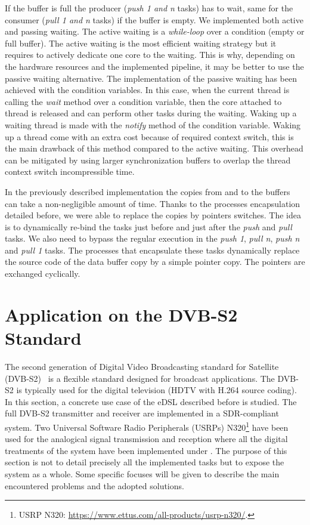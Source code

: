If the buffer is full the producer (\emph{push 1 and n} tasks) has to wait, same
for the consumer (\emph{pull 1 and n} tasks) if the buffer is empty. We
implemented both active and passing waiting. The active waiting is a
\emph{while-loop} over a condition (empty or full buffer). The active waiting is
the most efficient waiting strategy but it requires to actively dedicate one
core to the waiting. This is why, depending on the hardware resources and the
implemented pipeline, it may be better to use the passive waiting alternative.
The implementation of the passive waiting has been achieved with the 
condition variables. In this case, when the current thread is calling the
\emph{wait} method over a condition variable, then the core attached to thread
is released and can perform other tasks during the waiting. Waking up a waiting
thread is made with the \emph{notify} method of the condition variable. Waking
up a thread come with an extra cost because of required context switch, this is
the main drawback of this method compared to the active waiting. This overhead
can be mitigated by using larger synchronization buffers to overlap the thread
context switch incompressible time.

In the previously described implementation the copies from and to the buffers
can take a non-negligible amount of time. Thanks to the processes encapsulation
detailed before, we were able to replace the copies by pointers switches. The
idea is to dynamically re-bind the tasks just before and just after the
\emph{push} and \emph{pull} tasks. We also need to bypass the regular execution
in the \emph{push 1}, \emph{pull n}, \emph{push n} and \emph{pull 1} tasks. The
processes that encapsulate these tasks dynamically replace the source code of
the data buffer copy by a simple pointer copy. The pointers are exchanged
cyclically.

\section{Application on the DVB-S2 Standard}

The second generation of Digital Video Broadcasting standard for Satellite
(DVB-S2)~\cite{ETSI2005} is a flexible standard designed for broadcast
applications. The DVB-S2 is typically used for the digital television (HDTV
with H.264 source coding). In this section, a concrete use case of the \AFFECT
eDSL described before is studied. The full DVB-S2 transmitter and receiver are
implemented in a SDR-compliant system. Two Universal Software Radio Peripherals
(USRPs) N320\footnote{USRP N320: \url{https://www.ettus.com/all-products/usrp-n320/}.}
have been used for the analogical signal transmission and reception where all
the digital treatments of the system have been implemented under \AFFECT. The
purpose of this section is not to detail precisely all the implemented tasks
but to expose the system as a whole. Some specific focuses will be given to
describe the main encountered problems and the adopted solutions.

